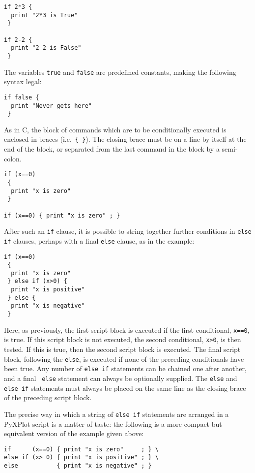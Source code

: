\begin{verbatim}
if 2*3 {
  print "2*3 is True"
 }

if 2-2 {
  print "2-2 is False"
 }
\end{verbatim}

\noindent The variables {\tt true} and {\tt false} are predefined constants, making the following syntax legal:

\begin{verbatim}
if false {
  print "Never gets here"
 }
\end{verbatim}

As in C, the block of commands which are to be conditionally executed is
enclosed in braces (i.e.\ {\tt \{~\}}).  The closing brace must be on a line by
itself at the end of the block, or separated from the last command in the block
by a semi-colon.

\begin{verbatim}
if (x==0)
 {
  print "x is zero"
 }

if (x==0) { print "x is zero" ; }
\end{verbatim}

After such an {\tt if} clause, it is possible to string together further
conditions in {\tt else if} clauses, perhaps with a final {\tt else} clause, as
in the example:

\begin{verbatim}
if (x==0)
 {
  print "x is zero"
 } else if (x>0) {
  print "x is positive"
 } else {
  print "x is negative"
 }
\end{verbatim}

Here, as previously, the first script block is executed if the first
conditional, {\tt x==0}, is true. If this script block is not executed, the
second conditional, {\tt x>0}, is then tested. If this is true, then the second
script block is executed.  The final script block, following the {\tt else}, is
executed if none of the preceding conditionals have been true. Any number of
{\tt else if} statements can be chained one after another, and a final {\tt
else} statement can always be optionally supplied. The {\tt else} and {\tt else
if} statements must always be placed on the same line as the closing brace of
the preceding script block.

The precise way in which a string of {\tt else if} statements are arranged in a
PyXPlot script is a matter of taste: the following is a more compact but
equivalent version of the example given above:

\begin{verbatim}
if      (x==0) { print "x is zero"     ; } \
else if (x> 0) { print "x is positive" ; } \
else           { print "x is negative" ; }
\end{verbatim}

